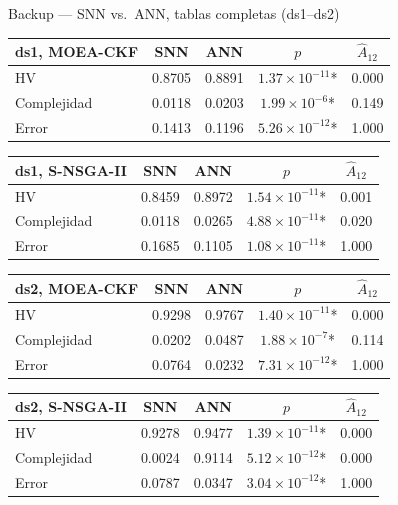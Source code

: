 \documentclass[aspectratio=169,10pt]{beamer}
\newcommand{\Atwelve}{\ensuremath{\hat{A}_{12}}}
\begin{document}
{\begin{frame}{Backup --- SNN vs.\ ANN, tablas completas (ds1--ds2)}
  \centering\tiny
  \begin{tabular}{lcccc}
    \toprule
    \textbf{ds1, MOEA-CKF} & SNN & ANN & $p$ & \Atwelve \\ \midrule
    HV & 0.8705 & 0.8891 & $1.37\times10^{-11}$* & 0.000 \\
    Complejidad & 0.0118 & 0.0203 & $1.99\times10^{-6}$* & 0.149 \\
    Error & 0.1413 & 0.1196 & $5.26\times10^{-12}$* & 1.000 \\ \bottomrule
  \end{tabular}
  \hspace{0.4cm}
  \begin{tabular}{lcccc}
    \toprule
    \textbf{ds1, S-NSGA-II} & SNN & ANN & $p$ & \Atwelve \\ \midrule
    HV & 0.8459 & 0.8972 & $1.54\times10^{-11}$* & 0.001 \\
    Complejidad & 0.0118 & 0.0265 & $4.88\times10^{-11}$* & 0.020 \\
    Error & 0.1685 & 0.1105 & $1.08\times10^{-11}$* & 1.000 \\ \bottomrule
  \end{tabular}

  \vspace{6pt}
  \begin{tabular}{lcccc}
    \toprule
    \textbf{ds2, MOEA-CKF} & SNN & ANN & $p$ & \Atwelve \\ \midrule
    HV & 0.9298 & 0.9767 & $1.40\times10^{-11}$* & 0.000 \\
    Complejidad & 0.0202 & 0.0487 & $1.88\times10^{-7}$* & 0.114 \\
    Error & 0.0764 & 0.0232 & $7.31\times10^{-12}$* & 1.000 \\ \bottomrule
  \end{tabular}
  \hspace{0.4cm}
  \begin{tabular}{lcccc}
    \toprule
    \textbf{ds2, S-NSGA-II} & SNN & ANN & $p$ & \Atwelve \\ \midrule
    HV & 0.9278 & 0.9477 & $1.39\times10^{-11}$* & 0.000 \\
    Complejidad & 0.0024 & 0.9114 & $5.12\times10^{-12}$* & 0.000 \\
    Error & 0.0787 & 0.0347 & $3.04\times10^{-12}$* & 1.000 \\ \bottomrule
  \end{tabular}
\end{frame}

}
\end{document}
